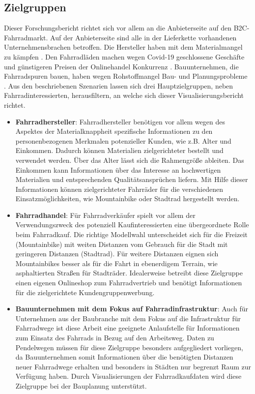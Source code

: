 \documentclass[usegeometry=true]{scrartcl}
\begin{document}
\subsection{Zielgruppen}
Dieser Forschungsbericht richtet sich vor allem an die Anbieterseite auf den B2C-Fahrradmarkt. Auf der Anbieterseite sind alle in der Lieferkette vorhandenen Unternehmensbrachen betroffen. Die Hersteller haben mit dem Materialmangel zu kämpfen \cite{tagesschau.11.03.2021}. Den Fahrradläden machen wegen Covid-19 geschlossene Geschäfte und günstigeren Preisen der Onlinehandel Konkurrenz \cite{VeloTOTALDasgroteNetzwerkrundumdasThemaFahrrad.2021,Follmer.03.09.2021}. Bauunternehmen, die Fahrradspuren bauen, haben wegen Rohstoffmangel  Bau- und Planungsprobleme \cite{Knitterscheidt.14.06.2021}. Aus den beschriebenen Szenarien lassen sich drei Hauptzielgruppen, neben Fahrradinteressierten, herausfiltern, an welche sich dieser Visualisierungsbericht richtet.
\begin{itemize}
 \item \textbf{Fahrradhersteller}: 
 \newline Fahrradhersteller benötigen vor allem wegen des Aspektes der Materialknappheit spezifische Informationen zu den personenbezogenen Merkmalen potenzieller Kunden, wie z.B.  Alter und Einkommen. Dadurch können Materialien zielgerichteter bestellt und verwendet werden. Über das Alter lässt sich die Rahmengröße ableiten. Das Einkommen kann Informationen über das Interesse an hochwertigen Materialien und entsprechenden Qualitätsansprüchen liefern. Mit Hilfe dieser Informationen können zielgerichteter Fahrräder für die verschiedenen Einsatzmöglichkeiten, wie Mountainbike oder Stadtrad hergestellt werden. 
 \item \textbf{Fahrradhandel}:
 \newline Für Fahrradverkäufer spielt vor allem der Verwendungszweck des potenziell Kaufinteressierten eine übergeordnete Rolle beim Fahrradkauf. Die richtige Modellwahl unterscheidet sich für die Freizeit (Mountainbike) mit weiten Distanzen vom Gebrauch für die Stadt mit geringeren Distanzen (Stadtrad). Für weitere Distanzen eignen sich Mountainbikes besser als für die Fahrt in ebenerdigem Terrain, wie asphaltierten Straßen für Stadträder. Idealerweise betreibt diese Zielgruppe einen eigenen Onlineshop zum Fahrradvertrieb und benötigt Informationen für die zielgerichtete Kundengruppenwerbung. 

 \item \textbf{Bauunternehmen mit dem Fokus auf Fahrradinfrastruktur}:
 \newline Auch für Unternehmen aus der Baubranche mit dem Fokus auf die Infrastruktur für Fahrradwege ist diese Arbeit eine geeignete Anlaufstelle für Informationen zum Einsatz des Fahrrads in Bezug auf den Arbeitsweg. Daten zu Pendelwegen müssen für diese Zielgruppe besonders aufgegliedert vorliegen, da Bauunternehmen somit Informationen über die benötigten Distanzen neuer Fahrradwege erhalten und besonders in Städten nur begrenzt Raum zur Verfügung haben. Durch Visualisierungen der Fahrradkaufdaten wird diese Zielgruppe bei der Bauplanung unterstützt.
 
\end{itemize}
\end{document}

